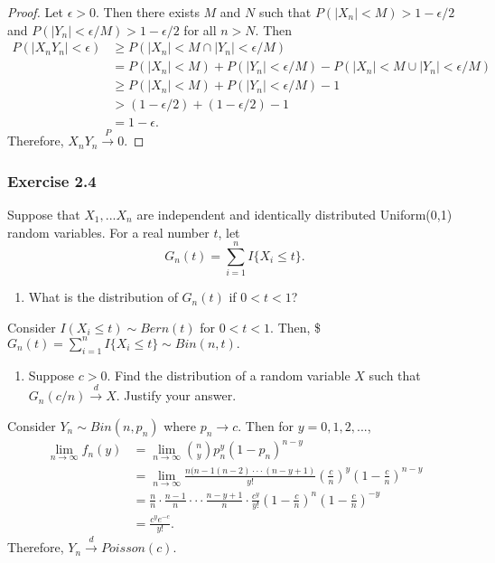 \documentclass[12pt,]{article}
\providecommand{\tightlist}{%
  \setlength{\itemsep}{0pt}\setlength{\parskip}{0pt}}
\begin{document}
\begin{proof}
Let $\epsilon > 0.$ Then there exists $M$ and $N$ such that $P(|X_n| < M) > 1-\epsilon/2$ and $P(|Y_n|<\epsilon/M)>1-\epsilon/2$ for all $n>N.$ Then
\begin{align*}
P(|X_nY_n|<\epsilon) & \ge P(|X_n|<M \cap |Y_n| < \epsilon/M)\\
& = P(|X_n|<M)+P(|Y_n|<\epsilon/M) - P(|X_n|<M \cup |Y_n| < \epsilon/M)\\
& \ge P(|X_n|<M)+P(|Y_n|<\epsilon/M) - 1\\
& > (1-\epsilon/2) + (1-\epsilon/2) -1\\
& = 1-\epsilon.
\end{align*}
Therefore, $X_nY_n\overset{P}\rightarrow 0.$
\end{proof}

\hypertarget{exercise-2.4}{%
\subsubsection{Exercise 2.4}\label{exercise-2.4}}

Suppose that \(X_1,...X_n\) are independent and identically distributed
Uniform(0,1) random variables. For a real number \(t\), let
\[G_n(t) = \sum_{i=1}^nI\{X_i\le t\}.\]

\begin{enumerate}
\def\labelenumi{(\alph{enumi})}
\tightlist
\item
  What is the distribution of \(G_n(t)\) if \(0<t<1\)?
\end{enumerate}

Consider \(I(X_i \le t)\sim Bern(t)\) for \(0<t<1.\) Then,
\$\(G_n(t) = \sum_{i=1}^nI\{X_i\le t\}\sim Bin(n, t).\)

\begin{enumerate}
\def\labelenumi{(\alph{enumi})}
\setcounter{enumi}{1}
\tightlist
\item
  Suppose \(c>0.\) Find the distribution of a random variable \(X\) such
  that \(G_n(c/n)\overset{d}\rightarrow X\). Justify your answer.
\end{enumerate}

Consider \(Y_n\sim Bin(n, p_n)\) where \(p_n \rightarrow c.\) Then for
\(y = 0, 1, 2, ...\), \begin{align*}
\lim_{n\rightarrow \infty}f_n(y) & = \lim_{n\rightarrow \infty} {n \choose y} p_n^y(1-p_n)^{n-y}\\
& = \lim_{n\rightarrow \infty} \frac{n(n-1(n-2)\cdot \cdot \cdot (n-y+1)}{y!} \left(\frac{c}{n}\right)^y\left(1-\frac{c}{n}\right)^{n-y}\\
& = \frac{n}{n}\cdot \frac{n-1}{n}\cdot \cdot \cdot \frac{n-y+1}{n}\cdot \frac{c^y}{y!}\left(1-\frac{c}{n}\right)^n\left(1-\frac{c}{n}\right)^{-y}\\
& = \frac{c^y e^{-c}}{y!}.
\end{align*} Therefore, \(Y_n \overset{d}\rightarrow Poisson(c).\)
\end{document}
